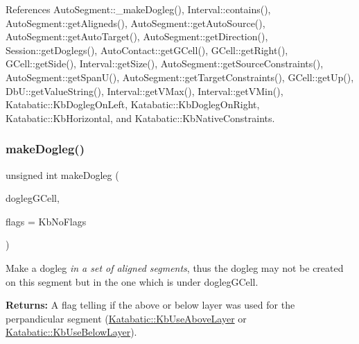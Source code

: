  

References Auto\+Segment\+::\+\_\+make\+Dogleg(), Interval\+::contains(), Auto\+Segment\+::get\+Aligneds(), Auto\+Segment\+::get\+Auto\+Source(), Auto\+Segment\+::get\+Auto\+Target(), Auto\+Segment\+::get\+Direction(), Session\+::get\+Doglegs(), Auto\+Contact\+::get\+G\+Cell(), G\+Cell\+::get\+Right(), G\+Cell\+::get\+Side(), Interval\+::get\+Size(), Auto\+Segment\+::get\+Source\+Constraints(), Auto\+Segment\+::get\+Span\+U(), Auto\+Segment\+::get\+Target\+Constraints(), G\+Cell\+::get\+Up(), Db\+U\+::get\+Value\+String(), Interval\+::get\+V\+Max(), Interval\+::get\+V\+Min(), Katabatic\+::\+Kb\+Dogleg\+On\+Left, Katabatic\+::\+Kb\+Dogleg\+On\+Right, Katabatic\+::\+Kb\+Horizontal, and Katabatic\+::\+Kb\+Native\+Constraints.

\mbox{\label{classKatabatic_1_1AutoSegment_aa21b16647c1750ba8b3eb9d99b12f073}} 
\subsubsection{\texorpdfstring{make\+Dogleg()}{makeDogleg()}\hspace{0.1cm}{\footnotesize\ttfamily [3/3]}}
{\footnotesize\ttfamily unsigned int make\+Dogleg (\begin{DoxyParamCaption}\item[{\hyperlink{classKatabatic_1_1GCell}{G\+Cell} $\ast$}]{dogleg\+G\+Cell,  }\item[{unsigned int}]{flags = {\ttfamily KbNoFlags} }\end{DoxyParamCaption})}

Make a dogleg {\itshape in a set of aligned segments}, thus the dogleg may not be created on {\ttfamily this} segment but in the one which is under {\ttfamily dogleg\+G\+Cell}.

{\bfseries Returns\+:} A flag telling if the above or below layer was used for the perpandicular segment (\hyperlink{namespaceKatabatic_a2af2ad6b6441614038caf59d04b3b217af756099f1bbe259dd1bf22067dc40eac}{Katabatic\+::\+Kb\+Use\+Above\+Layer} or \hyperlink{namespaceKatabatic_a2af2ad6b6441614038caf59d04b3b217a41cbd981337678e042354f340bfae25d}{Katabatic\+::\+Kb\+Use\+Below\+Layer}). 

